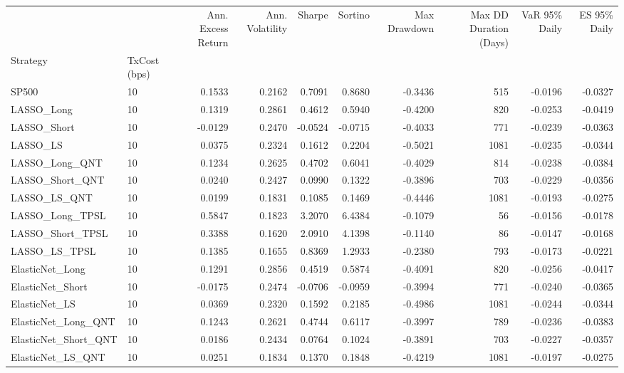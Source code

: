 \begin{tabular}{llrrrrrrrr}
\toprule
 &  & Ann. Excess Return & Ann. Volatility & Sharpe & Sortino & Max Drawdown & Max DD Duration (Days) & VaR 95\% Daily & ES 95\% Daily \\
Strategy & TxCost (bps) &  &  &  &  &  &  &  &  \\
\midrule
SP500 & 10 & 0.1533 & 0.2162 & 0.7091 & 0.8680 & -0.3436 & 515 & -0.0196 & -0.0327 \\
\cline{1-10}
LASSO\_Long & 10 & 0.1319 & 0.2861 & 0.4612 & 0.5940 & -0.4200 & 820 & -0.0253 & -0.0419 \\
\cline{1-10}
LASSO\_Short & 10 & -0.0129 & 0.2470 & -0.0524 & -0.0715 & -0.4033 & 771 & -0.0239 & -0.0363 \\
\cline{1-10}
LASSO\_LS & 10 & 0.0375 & 0.2324 & 0.1612 & 0.2204 & -0.5021 & 1081 & -0.0235 & -0.0344 \\
\cline{1-10}
LASSO\_Long\_QNT & 10 & 0.1234 & 0.2625 & 0.4702 & 0.6041 & -0.4029 & 814 & -0.0238 & -0.0384 \\
\cline{1-10}
LASSO\_Short\_QNT & 10 & 0.0240 & 0.2427 & 0.0990 & 0.1322 & -0.3896 & 703 & -0.0229 & -0.0356 \\
\cline{1-10}
LASSO\_LS\_QNT & 10 & 0.0199 & 0.1831 & 0.1085 & 0.1469 & -0.4446 & 1081 & -0.0193 & -0.0275 \\
\cline{1-10}
LASSO\_Long\_TPSL & 10 & 0.5847 & 0.1823 & 3.2070 & 6.4384 & -0.1079 & 56 & -0.0156 & -0.0178 \\
\cline{1-10}
LASSO\_Short\_TPSL & 10 & 0.3388 & 0.1620 & 2.0910 & 4.1398 & -0.1140 & 86 & -0.0147 & -0.0168 \\
\cline{1-10}
LASSO\_LS\_TPSL & 10 & 0.1385 & 0.1655 & 0.8369 & 1.2933 & -0.2380 & 793 & -0.0173 & -0.0221 \\
\cline{1-10}
ElasticNet\_Long & 10 & 0.1291 & 0.2856 & 0.4519 & 0.5874 & -0.4091 & 820 & -0.0256 & -0.0417 \\
\cline{1-10}
ElasticNet\_Short & 10 & -0.0175 & 0.2474 & -0.0706 & -0.0959 & -0.3994 & 771 & -0.0240 & -0.0365 \\
\cline{1-10}
ElasticNet\_LS & 10 & 0.0369 & 0.2320 & 0.1592 & 0.2185 & -0.4986 & 1081 & -0.0244 & -0.0344 \\
\cline{1-10}
ElasticNet\_Long\_QNT & 10 & 0.1243 & 0.2621 & 0.4744 & 0.6117 & -0.3997 & 789 & -0.0236 & -0.0383 \\
\cline{1-10}
ElasticNet\_Short\_QNT & 10 & 0.0186 & 0.2434 & 0.0764 & 0.1024 & -0.3891 & 703 & -0.0227 & -0.0357 \\
\cline{1-10}
ElasticNet\_LS\_QNT & 10 & 0.0251 & 0.1834 & 0.1370 & 0.1848 & -0.4219 & 1081 & -0.0197 & -0.0275 \\

\end{tabular}
